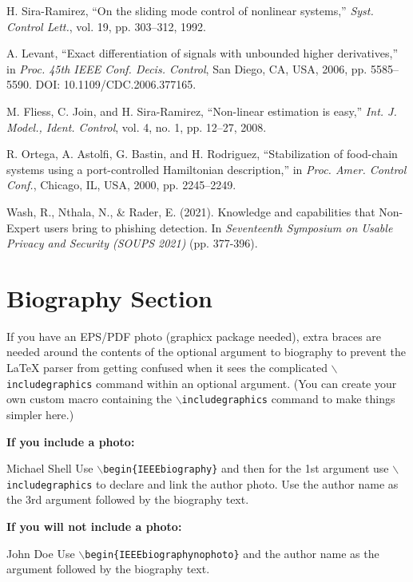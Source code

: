 \documentclass[lettersize,journal]{IEEEtran}
\begin{document}
\begin{thebibliography}{1}
  H. Sira-Ramirez, ``On the sliding mode control of nonlinear systems,'' \textit{Syst. Control Lett.}, vol. 19, pp. 303--312, 1992.

  A. Levant, ``Exact differentiation of signals with unbounded higher derivatives,''  in \textit{Proc. 45th IEEE Conf. Decis.
    Control}, San Diego, CA, USA, 2006, pp. 5585--5590. DOI: 10.1109/CDC.2006.377165.

  M. Fliess, C. Join, and H. Sira-Ramirez, ``Non-linear estimation is easy,'' \textit{Int. J. Model., Ident. Control}, vol. 4, no. 1, pp. 12--27, 2008.

  R. Ortega, A. Astolfi, G. Bastin, and H. Rodriguez, ``Stabilization of food-chain systems using a port-controlled Hamiltonian description,'' in \textit{Proc. Amer. Control Conf.}, Chicago, IL, USA,
  2000, pp. 2245--2249.

  Wash, R., Nthala, N., & Rader, E. (2021). Knowledge and capabilities that {Non-Expert} users bring to phishing detection. In \textit{Seventeenth Symposium on Usable Privacy and Security (SOUPS 2021)} (pp. 377-396).

\end{thebibliography}

\newpage

\section{Biography Section}
If you have an EPS/PDF photo (graphicx package needed), extra braces are needed
around the contents of the optional argument to biography to prevent the LaTeX
parser from getting confused when it sees the complicated
$\backslash${\tt{includegraphics}} command within an optional argument. (You
can create your own custom macro containing the
$\backslash${\tt{includegraphics}} command to make things simpler here.)

\vspace{11pt}

\bf{If you include a photo:}\vspace{-33pt}
\begin{IEEEbiography}{Michael Shell}
  Use $\backslash${\tt{begin\{IEEEbiography\}}} and then for the 1st argument use $\backslash${\tt{includegraphics}} to declare and link the author photo.
  Use the author name as the 3rd argument followed by the biography text.
\end{IEEEbiography}

\vspace{11pt}

\bf{If you will not include a photo:}\vspace{-33pt}
\begin{IEEEbiographynophoto}{John Doe}
  Use $\backslash${\tt{begin\{IEEEbiographynophoto\}}} and the author name as the argument followed by the biography text.
\end{IEEEbiographynophoto}

\vfill
\end{document}
